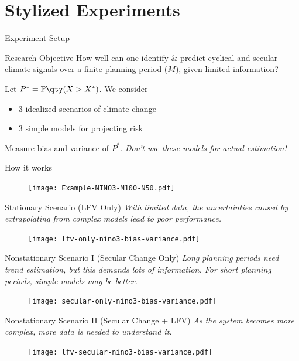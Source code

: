 \documentclass[
  10pt,     %
]{beamer}
\begin{document}
\section{Stylized Experiments}

\begin{frame}{Experiment Setup}
  \begin{alertblock}{Research Objective}
    How well can one identify \& predict cyclical and secular climate signals over a finite planning period ($M$),  given limited information?
 \end{alertblock}
  Let $P^* = \mathbb{P} \qty(X > X^*)$.
  \pause
  We consider
  \begin{itemize}
    \item 3 \alert{idealized scenarios of climate change}
    \item 3 \alert{simple} models for projecting risk
  \end{itemize}
  Measure bias and variance of $P^*$.
  \vfill
  \pause
  \emph{Don't use these models for actual estimation!}
\end{frame}

\begin{frame}{How it works}
  \begin{figure}
    \centering
    \texttt{[image: Example-NINO3-M100-N50.pdf]}
  \end{figure}
\end{frame}

\begin{frame}{Stationary Scenario (LFV Only)}
  \emph{With limited data, the uncertainties caused by extrapolating from complex models lead to poor performance.}
  \begin{figure}
    \centering
    \texttt{[image: lfv-only-nino3-bias-variance.pdf]}
  \end{figure}
\end{frame}

\begin{frame}{Nonstationary Scenario I (Secular Change Only)}
  \emph{Long planning periods need trend estimation, but this demands lots of information.
  For short planning periods, simple models may be better.}
  \begin{figure}
    \centering
    \texttt{[image: secular-only-nino3-bias-variance.pdf]}
  \end{figure}
\end{frame}

\begin{frame}{Nonstationary Scenario II (Secular Change + LFV)}
  \emph{As the system becomes more complex, more data is needed to understand it.}
  \begin{figure}
    \centering
    \texttt{[image: lfv-secular-nino3-bias-variance.pdf]}
  \end{figure}
\end{frame}
\end{document}
